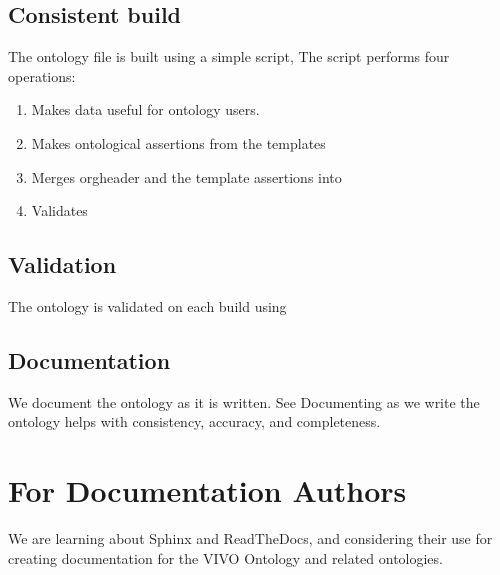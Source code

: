 \documentclass[letterpaper,10pt,english]{sphinxmanual}
\begin{document}
\section{Consistent build}
\label{\detokenize{ontology-authors:consistent-build}}
\sphinxAtStartPar
The ontology file  is built using a simple script,   The script
performs four operations:
\begin{enumerate}
%
\item {} 
\sphinxAtStartPar
Makes data useful for ontology users.

\item {} 
\sphinxAtStartPar
Makes ontological assertions from the templates

\item {} 
\sphinxAtStartPar
Merges org\sphinxhyphen{}header and the template assertions into 

\item {} 
\sphinxAtStartPar
Validates 

\end{enumerate}


\section{Validation}
\label{\detokenize{ontology-authors:validation}}
\sphinxAtStartPar
The ontology is validated on each build using 


\section{Documentation}
\label{\detokenize{ontology-authors:documentation}}
\sphinxAtStartPar
We document the ontology as it is written.  See   Documenting as we write the ontology helps with
consistency, accuracy, and completeness.


\chapter{For Documentation Authors}
\label{\detokenize{documentation-authors:for-documentation-authors}}\label{\detokenize{documentation-authors::doc}}
\sphinxAtStartPar
We are learning about Sphinx and ReadTheDocs, and considering their use
for creating documentation for the VIVO Ontology and related ontologies.
\end{document}
